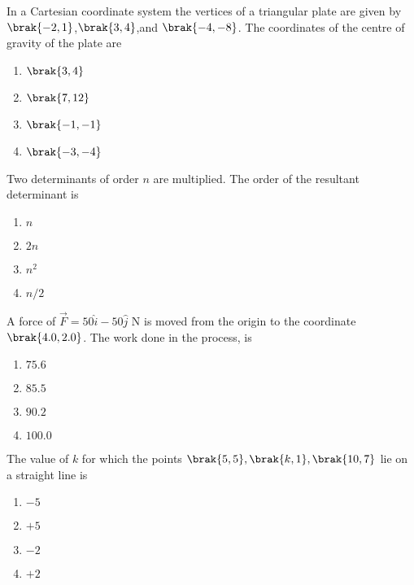 \item In a Cartesian coordinate system the vertices of a triangular plate are given by $\brak{-2, 1}$,$\brak{3, 4}$,and $\brak{-4, -8}$. The coordinates of the centre of gravity of the plate are
\hfill{}
\begin{multicols}{4}
\begin{enumerate}
\item $\brak{3,4}$
\item $\brak{7,12}$ 
\item $\brak{-1,-1}$
\item $\brak{-3,-4}$
\end{enumerate}
\end{multicols}
\item Two determinants of order $n$ are multiplied. The order of the resultant determinant is
\hfill{}
\begin{multicols}{4}
\begin{enumerate}
\item $n$
\item $2n$
\item $n^2$
\item $n/2$
\end{enumerate}
\end{multicols}
\item A force of $\vec{F} = 50\hat{i} - 50\hat{j}$ N is moved from the origin to the coordinate $\brak{4.0, 2.0}$. The work done in the process, is
\hfill{}
\begin{multicols}{4}
\begin{enumerate}
\item $75.6$
\item $85.5$
\item $90.2$
\item $100.0$
\end{enumerate}
\end{multicols}
\item  The value of $k$ for which the points $\brak{5,5},\brak{k,1},\brak{10,7}$ lie on a straight line is

\hfill{}
\begin{multicols}{4}
\begin{enumerate}
\item $-5$
\item $+5$
\item $-2$
\item $+2$
\end{enumerate}
\end{multicols}


